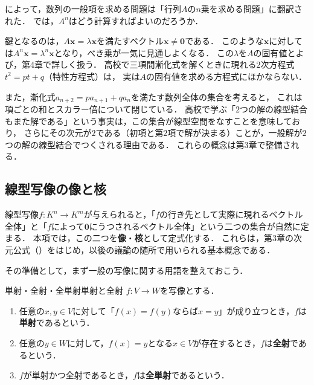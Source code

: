 \begin{mycolumn}
  によって，数列の一般項を求める問題は「行列$A$の$n$乗を求める問題」に翻訳された．
  では，$A^n$はどう計算すればよいのだろうか．

  鍵となるのは，$A\bm{x} = \lambda \bm{x}$を満たすベクトル$\bm{x} \ne \bm{0}$である．
  このような$\bm{x}$に対しては$A^n \bm{x} = \lambda^n \bm{x}$となり，べき乗が一気に見通しよくなる．
  この$\lambda$を$A$の固有値とよび，第4章で詳しく扱う．
  高校で三項間漸化式を解くときに現れる$2$次方程式$t^2 = pt + q$（特性方程式）は，
  実は$A$の固有値を求める方程式にほかならない．

  また，漸化式$a_{n+2} = p a_{n+1} + q a_n$を満たす数列全体の集合を考えると，
  これは項ごとの和とスカラー倍について閉じている．
  高校で学ぶ「$2$つの解の線型結合もまた解である」という事実は，この集合が線型空間をなすことを意味しており，
  さらにその次元が$2$である（初項と第$2$項で解が決まる）ことが，一般解が$2$つの解の線型結合でつくされる理由である．
  これらの概念は第3章で整備される．
\end{mycolumn}

\subsection{線型写像の像と核}

線型写像$f \colon K^n \to K^m$が与えられると，「$f$の行き先として実際に現れるベクトル全体」と「$f$によって$\bm{0}$にうつされるベクトル全体」という二つの集合が自然に定まる．
本項では，この二つを\textbf{像}・\textbf{核}として定式化する．
これらは，第3章の次元公式（）をはじめ，以後の議論の随所で用いられる基本概念である．

その準備として，まず一般の写像に関する用語を整えておこう．

\begin{definition}{単射・全射・全単射}{単射と全射}
  $f \colon V \to W$を写像とする．
  \begin{enumerate}[label=(\roman*),leftmargin=3.2em]
    \item 任意の$x, y \in V$に対して「$f(x) = f(y)$ならば$x = y$」が成り立つとき，$f$は\textbf{単射}であるという．
    \item 任意の$y \in W$に対して，$f(x) = y$となる$x \in V$が存在するとき，$f$は\textbf{全射}であるという．
    \item $f$が単射かつ全射であるとき，$f$は\textbf{全単射}であるという．
  \end{enumerate}
\end{definition}

